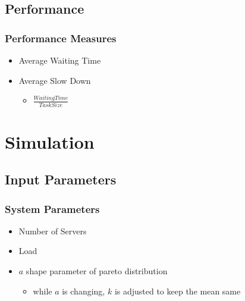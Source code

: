 \documentclass[red]{beamer}
\begin{document}
\subsection{Performance}
\begin{frame}
	\frametitle{Performance Measures}
	
	\begin{itemize}
		\item<1-> Average Waiting Time
		\item<2-> Average Slow Down
			\begin{itemize}
				\item $ \frac{Waiting Time}{Task Size} $
			\end{itemize}
	\end{itemize}

\end{frame}

\section{Simulation}
\subsection{Input Parameters}
\begin{frame}
	\frametitle{System Parameters}
	
	\begin{itemize}
		\item<1-> Number of Servers
		\item<2-> Load
		\item<3-> $a$ shape parameter of pareto distribution
			\begin{itemize}
			\item while $a$ is changing, $k$ is adjusted to keep the mean same
			\end{itemize}
	\end{itemize}

\end{frame}
\end{document}
